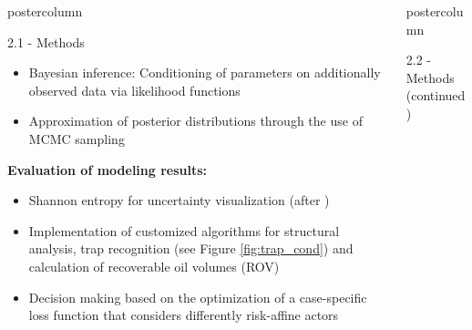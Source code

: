 \documentclass{beamer}
\newlength{\columnheight}
\begin{document}
\begin{frame}
\begin{columns}
\begin{column}{.249\textwidth}
\begin{beamercolorbox}[center]{postercolumn}
\begin{minipage}{.98\textwidth}
{\begin{myblock}{2.1 - Methods}
\begin{itemize}
	\item Bayesian inference: Conditioning of parameters on additionally observed data via likelihood functions
	\item Approximation of posterior distributions through the use of MCMC sampling
	\end{itemize}
\textbf{Evaluation of modeling results:}
										\begin{itemize}
										\item Shannon entropy for uncertainty visualization (after \citet{wellmann2012uncertainties})
										\item Implementation of customized algorithms for structural analysis, trap recognition (see Figure \ref{fig:trap_cond}) and calculation of recoverable oil volumes (ROV)
										\item Decision making based on the optimization of a case-specific loss function that considers differently risk-affine actors
										\end{itemize}
						
\end{myblock}\vfill
					
					
		}\end{minipage}\end{beamercolorbox}
	\end{column}



\begin{column}{.499\textwidth}
	\begin{beamercolorbox}[center]{postercolumn}
		\begin{minipage}{.98\textwidth} %
				\parbox[t][\columnheight]{\textwidth}{ %
					
\begin{myblock}{2.2 - Methods (continued)}
	

\end{myblock}}
\end{minipage}
\end{beamercolorbox}
\end{column}
\end{columns}
\end{frame}
\end{document}
